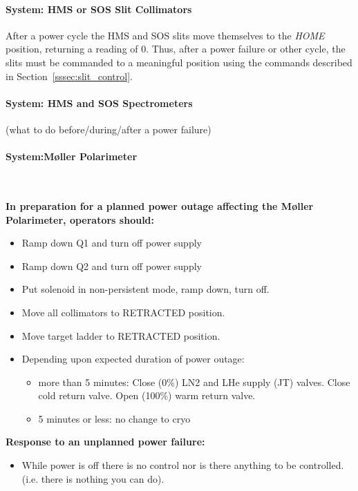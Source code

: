 {\paragraph {System: HMS or SOS Slit Collimators}
After a power cycle the HMS and SOS slits move themselves to the {\it HOME} position,
returning a reading of 0. Thus, after a power failure or other cycle, the slits
must be commanded to a meaningful position using the commands described in
Section~\ref{sssec:slit_control}.
\paragraph {System: HMS and SOS Spectrometers}
(what to do before/during/after a power failure)

\pagebreak[2]
\paragraph {System:M\o ller Polarimeter}~ 

{\bf In preparation for a planned power outage affecting the M\o ller Polarimeter, 
operators should:}

\begin{itemize}
\item Ramp down Q1 and turn off power supply
\item Ramp down Q2 and turn off power supply
\item Put solenoid in non-persistent mode, ramp down, turn off.
\item Move all collimators to RETRACTED position.
\item Move target ladder to RETRACTED position.
\item Depending upon expected duration of power outage:
	\begin{itemize}

   	 \item{more than 5 minutes:}
        Close (0\%) LN2 and LHe supply (JT) valves.
        Close cold return valve.
        Open (100\%) warm return valve.

   	 \item{5 minutes or less:} no change to cryo
	\end{itemize}
\end{itemize}

{\bf Response to an unplanned power failure:}
\begin{itemize}
\item While power is off there is no control nor is there anything
to be controlled. (i.e. there is nothing you can do).


\end{itemize}}
